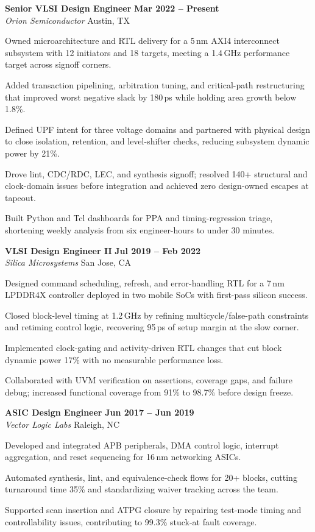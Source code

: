 \documentclass[10pt,letterpaper]{article}
\newcommand{\role}[4]{%
  \textbf{\color{siliconnavy}#1} \hfill {\small\textbf{#4}}\\[-1pt]
  \textit{\color{signalblue}#2} \hfill {\small\color{textgray}#3}\par
}
\begin{document}
\role{Senior VLSI Design Engineer}{Orion Semiconductor}{Austin, TX}{Mar 2022 -- Present}
\begin{compactitem}
  \item Owned microarchitecture and RTL delivery for a 5\,nm AXI4 interconnect subsystem with 12 initiators and 18 targets, meeting a 1.4\,GHz performance target across signoff corners.
  \item Added transaction pipelining, arbitration tuning, and critical-path restructuring that improved worst negative slack by 180\,ps while holding area growth below 1.8\%.
  \item Defined UPF intent for three voltage domains and partnered with physical design to close isolation, retention, and level-shifter checks, reducing subsystem dynamic power by 21\%.
  \item Drove lint, CDC/RDC, LEC, and synthesis signoff; resolved 140+ structural and clock-domain issues before integration and achieved zero design-owned escapes at tapeout.
  \item Built Python and Tcl dashboards for PPA and timing-regression triage, shortening weekly analysis from six engineer-hours to under 30 minutes.
\end{compactitem}

\role{VLSI Design Engineer II}{Silica Microsystems}{San Jose, CA}{Jul 2019 -- Feb 2022}
\begin{compactitem}
  \item Designed command scheduling, refresh, and error-handling RTL for a 7\,nm LPDDR4X controller deployed in two mobile SoCs with first-pass silicon success.
  \item Closed block-level timing at 1.2\,GHz by refining multicycle/false-path constraints and retiming control logic, recovering 95\,ps of setup margin at the slow corner.
  \item Implemented clock-gating and activity-driven RTL changes that cut block dynamic power 17\% with no measurable performance loss.
  \item Collaborated with UVM verification on assertions, coverage gaps, and failure debug; increased functional coverage from 91\% to 98.7\% before design freeze.
\end{compactitem}

\role{ASIC Design Engineer}{Vector Logic Labs}{Raleigh, NC}{Jun 2017 -- Jun 2019}
\begin{compactitem}
  \item Developed and integrated APB peripherals, DMA control logic, interrupt aggregation, and reset sequencing for 16\,nm networking ASICs.
  \item Automated synthesis, lint, and equivalence-check flows for 20+ blocks, cutting turnaround time 35\% and standardizing waiver tracking across the team.
  \item Supported scan insertion and ATPG closure by repairing test-mode timing and controllability issues, contributing to 99.3\% stuck-at fault coverage.
\end{compactitem}
\end{document}
